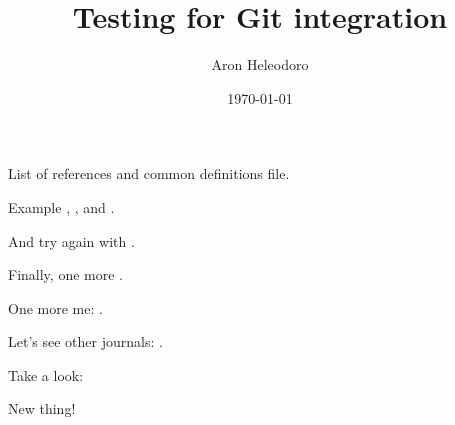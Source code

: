 \documentclass{article}
\title{Testing for Git integration}
\author{Aron Heleodoro}
\date{\today}
\begin{document}
\maketitle

List of references and common definitions file.

Example \cite{benjamin_hennion_higher_2017}, \cite{heleodoro_geometry_2018}, \cite{Raskin-D-modules} and \cite{HA}.

And try again with \cite{heleodoro_geometry_2018}.

Finally, one more \cite{elmanto2020nilpotent}.

One more me: \cite{heleodoro2020prestacks}.

Let's see other journals: \cite{AGH}.

Take a look: \cites{shirane2020double,shirane2020arXiv201009243S}

New thing!

% 
% 

\printbibliography
\end{document}
